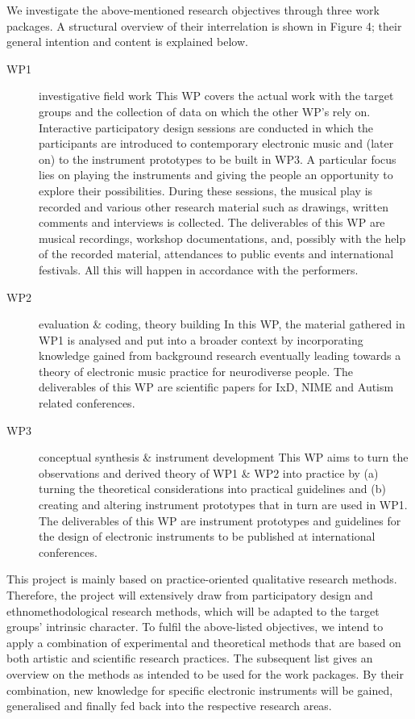 \documentclass{chi-ext}
\begin{document}
\begin{multicols}{2}

We investigate the above-mentioned research objectives through three work packages. A structural overview of their interrelation is shown in Figure 4; their general intention and content is explained below.
\begin{description}
\item[WP1] investigative field work This WP covers the actual work with the target groups and the collection of data on which the other WP’s rely on. Interactive participatory design sessions are conducted in which the participants are introduced to contemporary electronic music and (later on) to the instrument prototypes to be built in WP3. A particular focus lies on playing the instruments and giving the people an opportunity to explore their possibilities. During these sessions, the musical play is recorded and various other research material such as drawings, written comments and interviews is collected.
The deliverables of this WP are musical recordings, workshop documentations, and, possibly with the help of the recorded material, attendances to public events and international festivals. All this will happen in accordance with the performers.
\item[WP2] evaluation \& coding, theory building In this WP, the material gathered in WP1 is analysed and put into a broader context by incorporating knowledge gained from background research eventually leading towards a theory of electronic music practice for neurodiverse people.
The deliverables of this WP are scientific papers for IxD, NIME and Autism related conferences.
	\item[WP3] conceptual synthesis \& instrument development This WP aims to turn the observations and derived theory of WP1 \& WP2 into practice by (a) turning the theoretical considerations into practical guidelines and (b) creating and altering instrument prototypes that in turn are used in WP1.
The deliverables of this WP are instrument prototypes and guidelines for the design of electronic instruments to be published at international conferences.
\end{description}

This project is mainly based on practice-oriented qualitative research methods. Therefore, the project will extensively draw from participatory design and ethnomethodological research methods, which will be adapted to the target groups’ intrinsic character. To fulfil the above-listed objectives, we intend to apply a combination of experimental and theoretical methods that are based on both artistic and scientific research practices. The subsequent list gives an overview on the methods as intended to be used for the work packages. By their combination, new knowledge for specific electronic instruments will be gained, generalised and finally fed back into the respective research areas.


\end{multicols}
\end{document}
